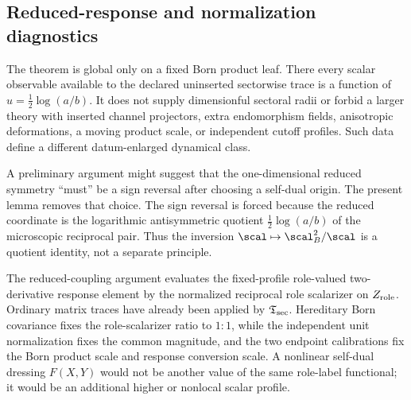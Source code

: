 \documentclass[11pt,a4paper]{article}
\begin{document}
\subsection{Reduced-response and normalization diagnostics}
\label{p3d:app:response-diagnostics}
\begin{remark}
\label{p3d:rem:no-hidden-beta-system-detail}
The theorem is global only on a fixed Born product leaf.  There every scalar
observable available to the declared uninserted sectorwise trace is a function
of \(u=\frac12\log(a/b)\).  It does not supply dimensionful sectoral radii or forbid a larger theory
with inserted channel projectors, extra endomorphism fields, anisotropic
deformations, a moving product scale, or independent cutoff profiles.  Such data define a different datum-enlarged dynamical class.
\end{remark}

\begin{remark}
\label{p3:rem:born-descent-gap-closed}
A preliminary argument might suggest that the one-dimensional reduced symmetry ``must'' be a sign
reversal after choosing a self-dual origin.  The present lemma removes that choice.  The sign
reversal is forced because the reduced coordinate is the logarithmic antisymmetric quotient
\(\frac12\log(a/b)\) of the microscopic reciprocal pair.  Thus the inversion
\(\scal\mapsto\scal_B^2/\scal\) is a quotient identity, not a separate principle.
\end{remark}

\begin{remark}
\label{p3:rem:geff_gap_closed}
The reduced-coupling argument evaluates the fixed-profile role-valued
two-derivative response element by the normalized reciprocal role scalarizer on \(Z_{\rm role}\).
Ordinary matrix traces have already been applied by
\(\mathfrak T_{\rm sec}\).  Hereditary Born covariance fixes the role-scalarizer ratio to
\(1:1\), while the independent unit normalization fixes the common magnitude, and the two endpoint calibrations fix the Born
product scale and response conversion scale.  A nonlinear self-dual dressing \(F(X,Y)\) would
not be another value of the same role-label functional; it would be an additional
higher or nonlocal scalar profile.
\end{remark}
\end{document}
